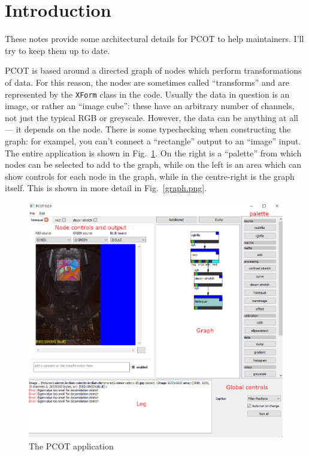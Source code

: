 

\section{Introduction}
These notes provide some architectural details for PCOT to help
maintainers. I'll try to keep them up to date.

PCOT is based around a directed graph of nodes which perform
transformations of data. For this reason, the nodes are sometimes
called ``transforms'' and are represented by the \texttt{XForm} class
in the code.
Usually the data in question is an image, or rather an ``image cube'':
these have an arbitrary number of channels, not just the typical
RGB or greyscale. However, the data can be anything at all --- it depends
on the node. There is some typechecking when constructing the graph:
for exampel, you can't connect a ``rectangle'' output to an ``image'' input.
The entire application is shown in Fig.~\ref{app.png}. On the right
is a ``palette'' from which nodes can be selected to add to the graph,
while on the left
is an area which can show controls for each node in the graph, while
in the centre-right is the graph itself. This is shown in more detail
in Fig.~\ref{graph.png}.

\begin{figure}[ht]
\center
\includegraphics[width=5in]{app.png}
\caption{The PCOT application}
\label{app.png}
\end{figure}

